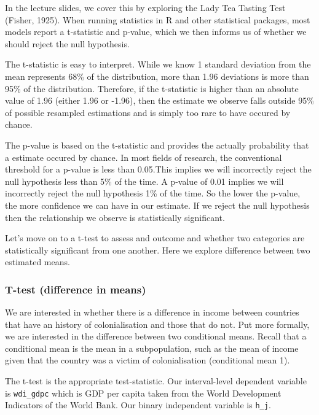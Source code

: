 \documentclass[]{article}
\begin{document}
In the lecture slides, we cover this by exploring the Lady Tea Tasting Test (Fisher, 1925). When running statistics in R and other statistical packages, most models report a t-statistic and p-value, which we then informs us of whether we should reject the null hypothesis.

The t-statistic is easy to interpret. While we know 1 standard deviation from the mean represents 68\% of the distribution, more than 1.96 deviations is more than 95\% of the distribution. Therefore, if the t-statistic is higher than an absolute value of 1.96 (either 1.96 or -1.96), then the estimate we observe falls outside 95\% of possible resampled estimations and is simply too rare to have occured by chance.

The p-value is based on the t-statistic and provides the actually probability that a estimate occured by chance.
In most fields of research, the conventional threshold for a p-value is less than 0.05.This implies we will incorrectly reject the null hypothesis less than 5\% of the time.
A p-value of 0.01 implies we will incorrectly reject the null hypothesis 1\% of the time. So the lower the p-value, the more confidence we can have in our estimate.
If we reject the null hypothesis then the relationship we observe is statistically significant.

Let's move on to a t-test to assess and outcome and whether two categories are statistically significant from one another. Here we explore difference between two estimated means.

\hypertarget{t-test-difference-in-means}{%
\subsubsection{T-test (difference in means)}\label{t-test-difference-in-means}}

We are interested in whether there is a difference in income between countries that have an history of colonialisation and those that do not. Put more formally, we are interested in the difference between two conditional means. Recall that a conditional mean is the mean in a subpopulation, such as the mean of income given that the country was a victim of colonialisation (conditional mean 1).

The t-test is the appropriate test-statistic. Our interval-level dependent variable is \texttt{wdi\_gdpc} which is GDP per capita taken from the World Development Indicators of the World Bank. Our binary independent variable is \texttt{h\_j}.
\end{document}
